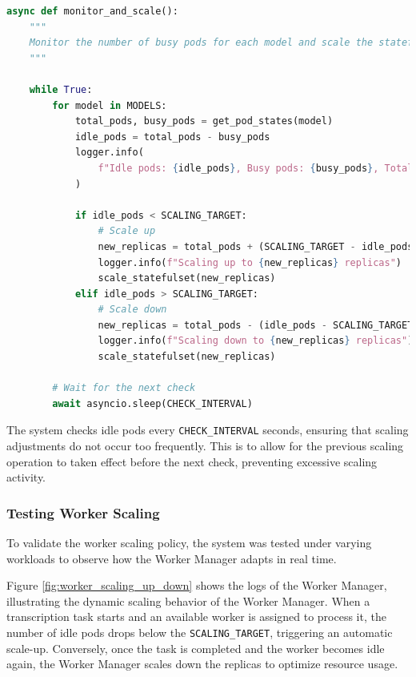 \begin{lstlisting}[language=python, caption={Worker Scaling Policy}, label={lst:worker_scaling}]
async def monitor_and_scale():
    """
    Monitor the number of busy pods for each model and scale the statefulset up or down based on the number of idle pods.
    """

    while True:
        for model in MODELS:
            total_pods, busy_pods = get_pod_states(model)
            idle_pods = total_pods - busy_pods
            logger.info(
                f"Idle pods: {idle_pods}, Busy pods: {busy_pods}, Total pods: {total_pods}"
            )

            if idle_pods < SCALING_TARGET:
                # Scale up
                new_replicas = total_pods + (SCALING_TARGET - idle_pods)
                logger.info(f"Scaling up to {new_replicas} replicas")
                scale_statefulset(new_replicas)
            elif idle_pods > SCALING_TARGET:
                # Scale down
                new_replicas = total_pods - (idle_pods - SCALING_TARGET)
                logger.info(f"Scaling down to {new_replicas} replicas")
                scale_statefulset(new_replicas)

        # Wait for the next check
        await asyncio.sleep(CHECK_INTERVAL)
\end{lstlisting}

The system checks idle pods every \texttt{CHECK\_INTERVAL} seconds, ensuring that scaling adjustments do not occur too frequently. This is to allow for the previous scaling operation to taken effect before the next check, preventing excessive scaling activity.

\subsubsection{Testing Worker Scaling}
To validate the worker scaling policy, the system was tested under varying workloads to observe how the Worker Manager adapts in real time.

Figure \ref{fig:worker_scaling_up_down} shows the logs of the Worker Manager, illustrating the dynamic scaling behavior of the Worker Manager. When a transcription task starts and an available worker is assigned to process it, the number of idle pods drops below the \texttt{SCALING\_TARGET}, triggering an automatic scale-up. Conversely, once the task is completed and the worker becomes idle again, the Worker Manager scales down the replicas to optimize resource usage.


